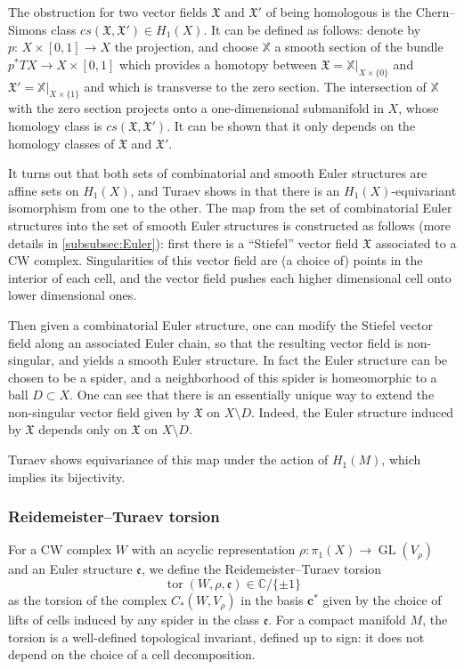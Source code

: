 \documentclass[10pt]{amsart}
\theoremstyle{plain}
\theoremstyle{definition}
\theoremstyle{remark}
\newcommand{\C}{\mathbb{C}}
\DeclareMathOperator{\GL}{GL}
\numberwithin{equation}{section}
\DeclareMathOperator{\tor}{tor}
\begin{document}
The obstruction for two vector fields $\mathfrak X$ and $\mathfrak X'$ of being homologous is the Chern--Simons class $cs(\mathfrak X, \mathfrak X') \!\in\!\! H_1(X)$.
It can be defined as follows: denote by \hbox{$p{:}\, X \!\times\! [0,1] \!\to\! X$} the projection, and choose $\mathbb X$ a smooth section of the bundle $p^*TX \to X \times [0,1]$ which provides a homotopy between $\mathfrak X = \mathbb X\vert_{X\times\{0\}}$
and $\mathfrak X' = \mathbb X\vert_{X\times\{1\}}$ and which is transverse to the zero section. The intersection of $\mathbb X$ with the zero section projects onto a one-dimensional submanifold in $X$, whose homology class is $cs(\mathfrak X, \mathfrak X')$. It can be shown that it only depends on the homology classes of $\mathfrak X$ and $\mathfrak X'$.

It turns out that both sets of combinatorial and smooth Euler structures are affine sets on $H_1(X)$, and Turaev shows in \cite[\S 6]{Turaev} that there is an $H_1(X)$-equivariant isomorphism from one to the other.
The map from the set of combinatorial Euler structures into the set of smooth Euler structures is constructed as follows (more details in \cref{subsubsec:Euler}): first there is a ``Stiefel'' vector field $\mathfrak X$ associated to a CW complex.
Singularities of this vector field are (a choice of) points in the interior of each cell, and the vector field pushes each higher dimensional cell onto lower dimensional ones.\par
Then given a combinatorial Euler structure, one can modify the Stiefel vector field along an associated Euler chain, so that the resulting vector field is non-singular, and yields a smooth Euler structure. In fact the Euler structure can be chosen to be a spider, and a neighborhood of this spider is homeomorphic to a ball $D \subset X$. One can see that there is an essentially unique way to extend the non-singular vector field given by $\mathfrak X$ on $X \setminus D$. Indeed, the Euler structure induced by $\mathfrak X$ depends only on $\mathfrak X$ on $X \setminus D$.\par
Turaev shows equivariance of this map under the action of $H_1(M)$, which implies its bijectivity.

\subsubsection{Reidemeister--Turaev torsion}
\label{subsec:RTT}
For a CW complex $W$ with an acyclic representation $\rho\colon \pi_1(X) \to \GL(V_\rho)$ and an Euler structure $\mathfrak e$, we define the Reidemeister--Turaev torsion
\[
\tor(W, \rho, \mathfrak e) \in \C/\{\pm 1\}
\]
as the torsion of the complex $C_*(W, V_\rho)$ in the basis $\boldsymbol{c}^*$ given by the choice of lifts of cells induced by any spider in the class $\mathfrak e$.
For a compact manifold $M$, the torsion is a well-defined topological invariant, defined up to sign: it does not depend on the choice of a cell decomposition.
\end{document}
